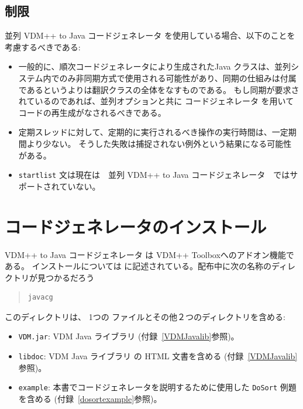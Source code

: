 \documentclass[\pformat,11pt]{jarticle}
\newcommand{\tcg}{コードジェネレータ}
\newcommand{\cg}{VDM++ to Java コードジェネレータ}
\newcommand{\ccg}{並列 \cg}
\newcommand{\JL}{VDM Java ライブラリ}
\begin{document}
\subsection{制限}
 \ccg{} を使用している場合、以下のことを考慮するべきである:
\begin{itemize}
\item 一般的に、順次コードジェネレータにより生成されたJava クラスは、並列システム内でのみ非同期方式で使用される可能性があり、同期の仕組みは付属であるというよりは翻訳クラスの全体をなすものである。
もし同期が要求されているのであれば、並列オプションと共に \tcg{} を用いてコードの再生成がなされるべきである。

\item 定期スレッドに対して、定期的に実行されるべき操作の実行時間は、一定期間より少ない。
そうした失敗は捕捉されない例外という結果になる可能性がある。

\item  \texttt{startlist} 文は現在は　\ccg　ではサポートされていない。
\end{itemize}


\appendix


\newpage



\newpage
\section{コードジェネレータのインストール}
\label{install}

 \cg{} は VDM++ Toolboxへのアドオン機能である。
インストールについては \cite{InstallPPMan-CSK}に記述されている。配布中に次の名称のディレクトリが見つかるだろう

\begin{quote}
\begin{verbatim}
javacg
\end{verbatim}
\end{quote}

このディレクトリは、 1つの ファイルとその他２つのディレクトリを含める:

\begin{itemize}
\item {\tt VDM.jar}:  \JL{} (付録~\ref{VDMJavalib}参照)。
\item {\tt libdoc}: \JL{} の HTML 文書を含める (付録~\ref{VDMJavalib}参照)。
\item {\tt example}: 本書でコードジェネレータを説明するために使用した \texttt{DoSort} 例題を含める (付録~\ref{dosortexample}参照)。
\end{itemize}
\end{document}
